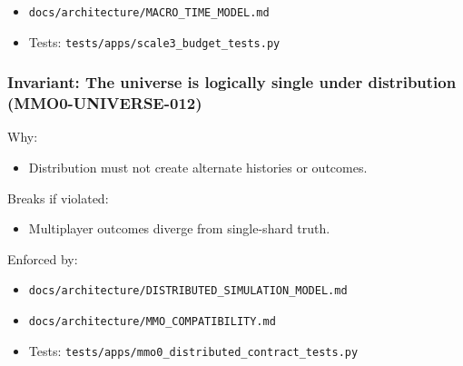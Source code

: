 \documentclass[9pt,a4paper,openany]{book}
\begin{document}
\begin{itemize}
\item \texttt{docs/\allowbreak{}architecture/\allowbreak{}MACRO\_\allowbreak{}TIME\_\allowbreak{}MODEL.\allowbreak{}md}
\end{itemize}


\begin{itemize}
\item Tests: \texttt{tests/\allowbreak{}apps/\allowbreak{}scale3\_\allowbreak{}budget\_\allowbreak{}tests.\allowbreak{}py}
\end{itemize}





\subsubsection{Invariant: The universe is logically single under distribution (MMO0-UNIVERSE-012)}


Why:



\begin{itemize}
\item Distribution must not create alternate histories or outcomes.\allowbreak{}
\end{itemize}


Breaks if violated:



\begin{itemize}
\item Multiplayer outcomes diverge from single-\allowbreak{}shard truth.\allowbreak{}
\end{itemize}


Enforced by:



\begin{itemize}
\item \texttt{docs/\allowbreak{}architecture/\allowbreak{}DISTRIBUTED\_\allowbreak{}SIMULATION\_\allowbreak{}MODEL.\allowbreak{}md}
\end{itemize}


\begin{itemize}
\item \texttt{docs/\allowbreak{}architecture/\allowbreak{}MMO\_\allowbreak{}COMPATIBILITY.\allowbreak{}md}
\end{itemize}


\begin{itemize}
\item Tests: \texttt{tests/\allowbreak{}apps/\allowbreak{}mmo0\_\allowbreak{}distributed\_\allowbreak{}contract\_\allowbreak{}tests.\allowbreak{}py}
\end{itemize}
\end{document}
